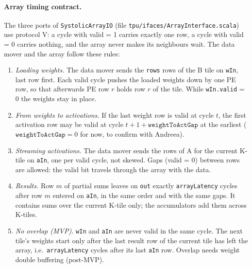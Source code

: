 \documentclass{article}
\begin{document}
\paragraph{Array timing contract.}
The three ports of \texttt{SystolicArrayIO} (file \texttt{tpu/ifaces/ArrayInterface.scala}) use protocol V:
a cycle with valid = 1 carries exactly one row, a cycle with valid = 0 carries nothing, and the array never
makes its neighbours wait. The data mover and the array follow these rules:
\begin{enumerate}
  \item \emph{Loading weights.} The data mover sends the \texttt{rows} rows of the B tile on \texttt{wIn},
        last row first. Each valid cycle pushes the loaded weights down by one PE row, so that afterwards
        PE row $r$ holds row $r$ of the tile. While \texttt{wIn.valid} = 0 the weights stay in place.
  \item \emph{From weights to activations.} If the last weight row is valid at cycle $t$, the first
        activation row may be valid at cycle $t + 1 + \texttt{weightToActGap}$ at the earliest
        ($\texttt{weightToActGap} = 0$ for now, to confirm with Andreea).
  \item \emph{Streaming activations.} The data mover sends the rows of A for the current K-tile on
        \texttt{aIn}, one per valid cycle, not skewed. Gaps (valid = 0) between rows are allowed:
        the valid bit travels through the array with the data.
  \item \emph{Results.} Row $m$ of partial sums leaves on \texttt{out} exactly \texttt{arrayLatency} cycles
        after row $m$ entered on \texttt{aIn}, in the same order and with the same gaps. It contains sums over
        the current K-tile only; the accumulators add them across K-tiles.
  \item \emph{No overlap (MVP).} \texttt{wIn} and \texttt{aIn} are never valid in the same cycle. The next
        tile's weights start only after the last result row of the current tile has left the array, i.e.\
        \texttt{arrayLatency} cycles after its last \texttt{aIn} row. Overlap needs weight double buffering
        (post-MVP).
\end{enumerate}

\end{document}
